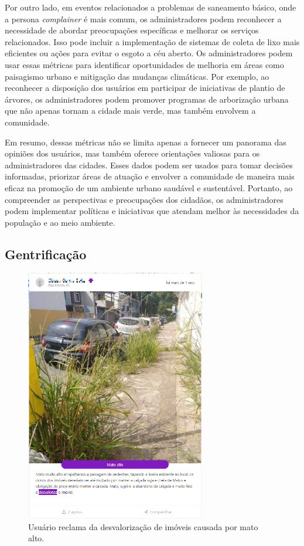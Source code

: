 Por outro lado, em eventos relacionados a problemas de saneamento básico, onde a persona \textit{complainer} é mais comum, os administradores podem reconhecer a necessidade de abordar preocupações específicas e melhorar os serviços relacionados. Isso pode incluir a implementação de sistemas de coleta de lixo mais eficientes ou ações para evitar o esgoto a céu aberto. Os administradores podem usar essas métricas para identificar oportunidades de melhoria em áreas como paisagismo urbano e mitigação das mudanças climáticas. Por exemplo, ao reconhecer a disposição dos usuários em participar de iniciativas de plantio de árvores, os administradores podem promover programas de arborização urbana que não apenas tornam a cidade mais verde, mas também envolvem a comunidade.

Em resumo, dessas métricas não se limita apenas a fornecer um panorama das opiniões dos usuários, mas também oferece orientações valiosas para os administradores das cidades. Esses dados podem ser usados para tomar decisões informadas, priorizar áreas de atuação e envolver a comunidade de maneira mais eficaz na promoção de um ambiente urbano saudável e sustentável. Portanto, ao compreender as perspectivas e preocupações dos cidadãos, os administradores podem implementar políticas e iniciativas que atendam melhor às necessidades da população e ao meio ambiente.

\subsection{Gentrificação}
\label{sec:eventos_populares_social_gentrification}

\begin{figure}[htb]
	\centering
	\includegraphics[width=0.7\textwidth]{images/colab_posts_social_gentrification.png}
	\caption{Usuário reclama da desvalorização de imóveis causada por mato alto.}
	\label{fig:colab_posts_social_gentrification}
\end{figure}

